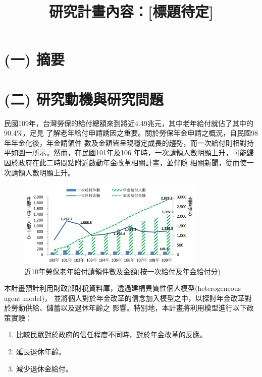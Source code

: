 \documentclass[12pt]{article}
\title{研究計畫內容：[標題待定]}
\date{}
\begin{document}
\begin{CJK*}{UTF8}{bkai}

\maketitle

\section*{\normalfont(一) 摘要}

\section*{\normalfont(二) 研究動機與研究問題}
民國109年，台灣勞保的給付總額來到將近4.49兆元，其中老年給付就佔了其中的90.4\%，足見
了解老年給付申請誘因之重要。關於勞保年金申請之概況，自民國98年年金化後，年金請領件
數及金額皆呈現穩定成長的趨勢，而一次給付則相對持平如圖一所示。然而，在民國101年及106
年時，一次請領人數明顯上升，可能歸因於政府在此二時間點附近啟動年金改革相關計畫，並伴隨
相關新聞，從而使一次請領人數明顯上升。
\begin{figure}[htbp]
    \centering
    \includegraphics[width=0.8\textwidth]{tw_pension_pay.png}
    \caption{近10年勞保老年給付請領件數及金額(按一次給付及年金給付分)\protect\footnotemark}
\end{figure}

本計畫預計利用財政部財稅資料庫，透過建構異質性個人模型(heterogeneous agent model)，
並將個人對於年金改革的信念加入模型之中，以探討年金改革對於勞動供給、儲蓄以及退休年齡之
影響。特別地，本計畫將利用模型進行以下政策實驗：
\begin{enumerate}
    \item 比較民眾對於政府的信任程度不同時，對於年金改革的反應。
    \item 延長退休年齡。
    \item 減少退休金給付。
\end{enumerate}


\end{CJK*}
\end{document}
